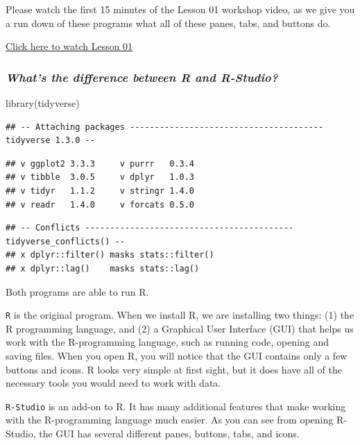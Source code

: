 \documentclass[
]{book}
\newenvironment{Shaded}{\begin{snugshade}}{\end{snugshade}}
\newcommand{\FunctionTok}[1]{\textcolor[rgb]{0.00,0.00,0.00}{#1}}
\newcommand{\NormalTok}[1]{#1}
\begin{document}
Please watch the first 15 minutes of the Lesson 01 workshop video, as we give you a run down of these programs what all of these panes, tabs, and buttons do.

\href{https://drive.google.com/file/d/1EYdeTYf1h-wI759Ci6w2ckWNjc194LT3/view?usp=sharing}{Click here to watch Lesson 01}

\hypertarget{whats-the-difference-between-r-and-r-studio}{%
\subsubsection{\texorpdfstring{\emph{What's the difference between R and R-Studio?}}{What's the difference between R and R-Studio?}}\label{whats-the-difference-between-r-and-r-studio}}

\begin{Shaded}
\begin{Highlighting}[]
\FunctionTok{library}\NormalTok{(tidyverse) }
\end{Highlighting}
\end{Shaded}

\begin{verbatim}
## -- Attaching packages --------------------------------------- tidyverse 1.3.0 --
\end{verbatim}

\begin{verbatim}
## v ggplot2 3.3.3     v purrr   0.3.4
## v tibble  3.0.5     v dplyr   1.0.3
## v tidyr   1.1.2     v stringr 1.4.0
## v readr   1.4.0     v forcats 0.5.0
\end{verbatim}

\begin{verbatim}
## -- Conflicts ------------------------------------------ tidyverse_conflicts() --
## x dplyr::filter() masks stats::filter()
## x dplyr::lag()    masks stats::lag()
\end{verbatim}

Both programs are able to run R.

\texttt{R} is the original program. When we install R, we are installing two things: (1) the R programming language, and (2) a Graphical User Interface (GUI) that helps us work with the R-programming language, such as running code, opening and saving files. When you open R, you will notice that the GUI contains only a few buttons and icons. R looks very simple at first sight, but it does have all of the necessary tools you would need to work with data.

\texttt{R-Studio} is an add-on to R. It has many additional features that make working with the R-programming language much easier. As you can see from opening R-Studio, the GUI has several different panes, buttons, tabs, and icons.
\end{document}
